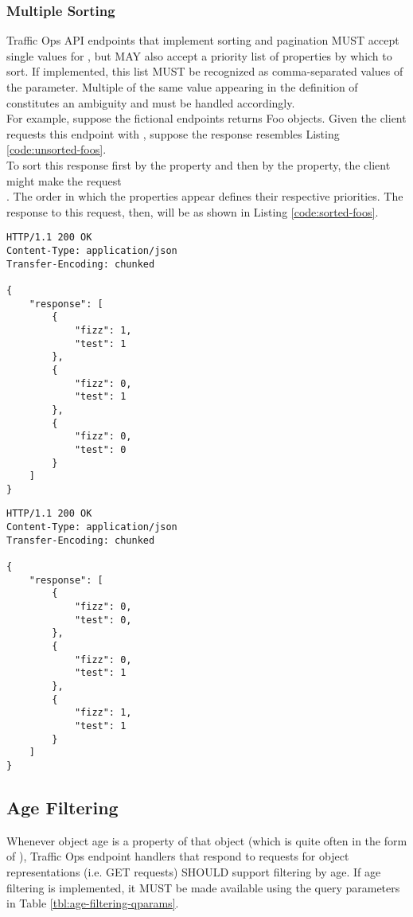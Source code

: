 \subsubsection{Multiple Sorting}
Traffic Ops API endpoints that implement sorting and pagination MUST accept
single values for , but MAY also accept a priority list of
properties by which to sort. If implemented, this list MUST be recognized as
comma-separated values of the  parameter. Multiple of the same
value appearing in the definition of  constitutes an ambiguity and
must be handled accordingly.\\
For example, suppose the fictional  endpoints returns Foo objects.
Given the client requests this endpoint with ,
suppose the response resembles Listing \ref{code:unsorted-foos}.\\
To sort this response first by the  property and then by the
 property, the client might make the request\\
. The order in which the
properties appear defines their respective priorities. The response to this
request, then, will be as shown in Listing \ref{code:sorted-foos}.

\newpage{}

\begin{codelisting}
\label{code:unsorted-foos}
\begin{verbatim}
HTTP/1.1 200 OK
Content-Type: application/json
Transfer-Encoding: chunked

{
	"response": [
		{
			"fizz": 1,
			"test": 1
		},
		{
			"fizz": 0,
			"test": 1
		},
		{
			"fizz": 0,
			"test": 0
		}
	]
}
\end{verbatim}
\end{codelisting}

\begin{codelisting}
\label{code:sorted-foos}
\begin{verbatim}
HTTP/1.1 200 OK
Content-Type: application/json
Transfer-Encoding: chunked

{
	"response": [
		{
			"fizz": 0,
			"test": 0,
		},
		{
			"fizz": 0,
			"test": 1
		},
		{
			"fizz": 1,
			"test": 1
		}
	]
}
\end{verbatim}
\end{codelisting}

\subsection{Age Filtering\label{sec:age-filtering}}
Whenever object age is a property of that object (which is quite often in the form of ), Traffic Ops endpoint
handlers that respond to requests for object representations (i.e. GET requests) SHOULD support filtering by age. If age filtering
is implemented, it MUST be made available using the query parameters in Table \ref{tbl:age-filtering-qparams}.

